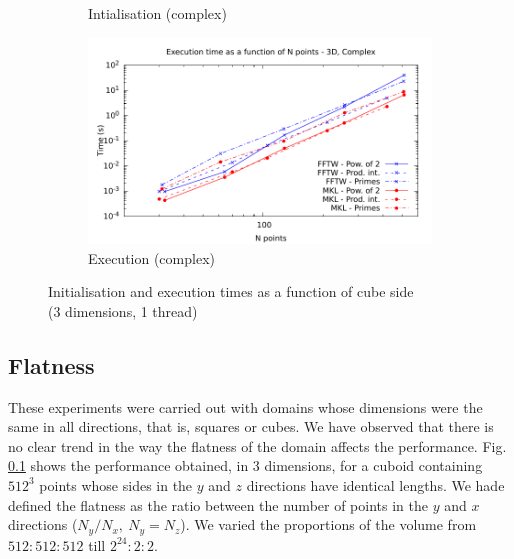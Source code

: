 \documentclass[12pt, a4paper]{article}
\begin{document}
\begin{figure}[H]
\begin{subfigure}{.5\textwidth}
\caption{Intialisation (complex)}
\label{3DCI}
\end{subfigure}%
\begin{subfigure}{.5\textwidth}
\centering
\includegraphics[width=.9\linewidth]{graphs/3d-exec-c.pdf}
\caption{Execution (complex)}
\label{3DC}
\end{subfigure}
\caption{Initialisation and execution times as a function of cube side\\(3 dimensions, 1 thread)}
\label{3D}
\end{figure}
\subsection{Flatness}\label{FLATNESS}

These experiments were carried out with domains whose dimensions were the same in all directions, that is, squares or cubes. We have observed that there is no clear trend in the way the flatness of the domain affects the performance. Fig. \ref{FLATNESS} shows the performance obtained, in 3 dimensions, for a cuboid containing $512^3$ points whose sides in the $y$ and $z$ directions have identical lengths. We hade defined the flatness as the ratio between the number of points in the $y$ and $x$ directions ($N_y/N_x,\ N_y=N_z$). We varied the proportions of the volume from $512:512:512$ till $2^{24}:2:2$.  \\
\end{document}
